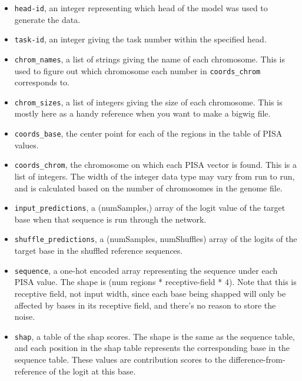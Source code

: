 \documentclass{article}
\begin{document}
\begin{itemize}
        \item \texttt{head-id}, an integer representing which head of the model was used to
            generate the data.
        \item \texttt{task-id}, an integer giving the task number within the specified head.
        \item \texttt{chrom\_names}, a list of strings giving the name of each chromosome.
            This is used to figure out which chromosome each number in \texttt{coords\_chrom}
            corresponds to.
        \item \texttt{chrom\_sizes}, a list of integers giving the size of each chromosome. This
            is mostly here as a handy reference when you want to make a bigwig file.
        \item \texttt{coords\_base}, the center point for each of the regions in the table of
            PISA values.
        \item \texttt{coords\_chrom}, the chromosome on which each PISA vector is found.
            This is a list of integers. The width of the integer data type may vary from run to
            run, and is calculated based on the number of chromosomes in the genome file.
        \item \texttt{input\_predictions}, a (numSamples,) array of the logit value of the target
            base when that sequence is run through the network.
        \item \texttt{shuffle\_predictions}, a (numSamples, numShuffles) array of the logits of
            the target base in the shuffled reference sequences.
        \item \texttt{sequence}, a one-hot encoded array representing the sequence under each
            PISA value. The shape is (num regions * receptive-field * 4). Note that this is
            receptive field, not input width, since each base being shapped will only be affected
            by bases in its receptive field, and there's no reason to store the noise.
        \item \texttt{shap}, a table of the shap scores. The shape is the same as the sequence
            table, and each position in the shap table represents the corresponding base in the
            sequence table. These values are contribution scores to the difference-from-reference
            of the logit at this base.

\end{itemize}
\end{document}
